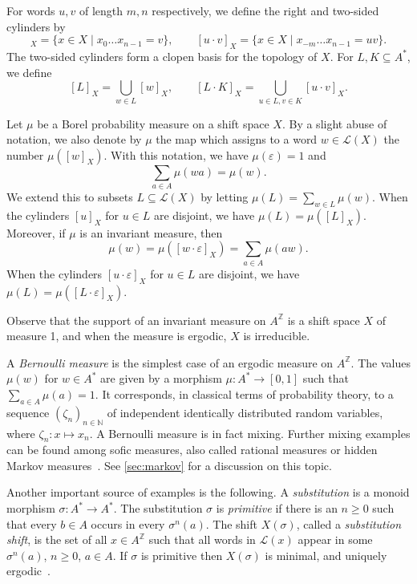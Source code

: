 \documentclass[a4paper,UKenglish,numberwithinsect,cleveref]{lipics-v2021}
\newcommand{\Z}{\mathbb{Z}}
\newcommand{\N}{\mathbb{N}}
\newcommand{\cL}{\mathcal L}
\newcommand*{\from}{\colon}
\begin{document}
For words $u,v$ of length $m,n$ respectively, we define the right and two-sided cylinders by 
\begin{equation*}
    [v]_X=\{x\in X\mid x_0\dots x_{n-1}=v\},\qquad [u\cdot v]_X=\{x\in X\mid x_{-m}\dots x_{n-1}=uv\}.
\end{equation*}
The two-sided cylinders form a clopen basis for the topology of $X$. For $L,K\subseteq A^*$, we define 
\[
    [L]_X=\bigcup_{w\in L}[w]_X,\qquad [L\cdot K]_X=\bigcup_{u\in L,v\in K}[u\cdot v]_X.
\]

Let $\mu$ be a Borel probability measure on a shift space $X$. By a slight abuse of notation, we also denote by $\mu$ the map which assigns to a word $w\in \cL(X)$ the number $\mu([w]_X)$. With this notation, we have $\mu(\varepsilon)=1$ and 
\begin{equation*}
    \sum_{a\in A}\mu(wa)=\mu(w).
\end{equation*}
We extend this to subsets $L\subseteq\cL(X)$ by letting $\mu(L)=\sum_{w\in L}\mu(w)$. 
When the cylinders $[u]_X$ for $u\in L$ are disjoint, we have $\mu(L)=\mu([L]_X)$. 
Moreover, if $\mu$ is an invariant measure, then 
\begin{equation}\label{eq:inv}
    \mu(w) = \mu([w\cdot\varepsilon]_X) = \sum_{a\in A}\mu(aw).
\end{equation}
When the cylinders $[u\cdot\varepsilon]_X$ for $u\in L$ are disjoint, we have $\mu(L)=\mu([L\cdot\varepsilon]_X)$.

Observe that the support of an invariant measure on $A^\Z$ is a shift space $X$ of measure 1, and when the measure is ergodic, $X$ is irreducible.

A \emph{Bernoulli measure} is the simplest case of an ergodic measure on $A^\Z$. The values $\mu(w)$ for $w\in A^*$ are given by a morphism $\mu\colon A^*\to[0,1]$ such that $\sum_{a\in A}\mu(a)=1$. It corresponds, in classical terms of probability theory, to a sequence $(\zeta_n)_{n\in\N}$ of independent identically distributed random variables, where $\zeta_n\from x\mapsto x_n$. A Bernoulli measure is in fact mixing. Further mixing examples can be found among sofic measures, also called rational measures or hidden Markov measures~\cite{Hansel1989,BoylePetersen2011}. 
See \cref{sec:markov} for a discussion on this topic.

Another important source of examples is the following. A \emph{substitution} is a monoid morphism $\sigma\colon A^*\to A^*$. The substitution $\sigma$ is \emph{primitive} if there is an $n\ge 0$ such that every $b\in A$ occurs in every $\sigma^n(a)$. The shift $X(\sigma)$, called a \emph{substitution shift}, is the set of all $x\in A^\Z$ such that all words in $\cL(x)$ appear in some $\sigma^n(a)$, $n\ge 0$, $a\in A$. If $\sigma$ is primitive then $X(\sigma)$ is minimal, and uniquely ergodic~\cite{Michel1974}. 
\end{document}
